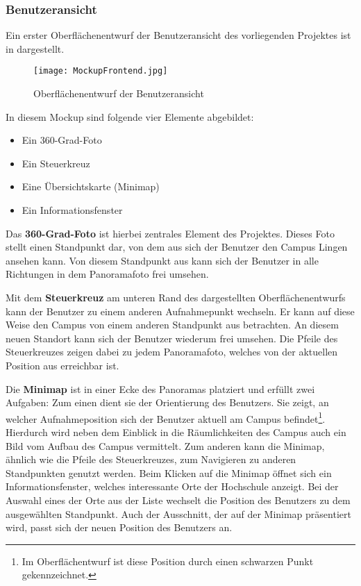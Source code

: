 \subsubsection{Benutzeransicht}
\label{sec:Benutzeransicht}

Ein erster Oberflächenentwurf der Benutzeransicht des vorliegenden Projektes
ist in  dargestellt.

\begin{figure}[htb]
\centering
\texttt{[image: MockupFrontend.jpg]}
\caption[Oberflächenentwurf der
Benutzeransicht]{Oberflächenentwurf der
Benutzeransicht\protect\footnotemark}
\label{fig:MockupFrontend}
\end{figure}

In diesem Mockup sind folgende vier Elemente abgebildet:

\begin{itemize}
 \item Ein 360-Grad-Foto
 \item Ein Steuerkreuz
 \item Eine Übersichtskarte (Minimap)
 \item Ein Informationsfenster
\end{itemize}

Das \textbf{360-Grad-Foto} ist hierbei zentrales Element des Projektes. Dieses
Foto stellt einen Standpunkt dar, von dem aus sich der Benutzer den Campus
Lingen ansehen kann. Von diesem Standpunkt aus kann sich der Benutzer in alle
Richtungen in dem Panoramafoto frei umsehen.

Mit dem \textbf{Steuerkreuz} am unteren Rand des dargestellten
Oberflächenentwurfs kann der Benutzer zu einem anderen Aufnahmepunkt wechseln.
Er kann auf diese Weise den Campus von einem anderen Standpunkt aus betrachten.
An diesem neuen Standort kann sich der Benutzer wiederum frei umsehen. Die
Pfeile des Steuerkreuzes zeigen dabei zu jedem Panoramafoto, welches von der
aktuellen Position aus erreichbar ist.

Die \textbf{Minimap} ist in einer Ecke des Panoramas platziert und erfüllt
zwei Aufgaben: Zum einen dient sie der Orientierung des Benutzers. Sie zeigt, an
welcher Aufnahmeposition sich der Benutzer aktuell am Campus
befindet\footnote{Im Oberflächentwurf ist diese Position durch einen schwarzen
Punkt gekennzeichnet.}. Hierdurch wird neben dem Einblick in die Räumlichkeiten
des Campus auch ein Bild vom Aufbau des Campus vermittelt. Zum anderen kann die
Minimap, ähnlich wie die Pfeile des Steuerkreuzes, zum Navigieren zu anderen
Standpunkten genutzt werden. Beim Klicken auf die Minimap öffnet sich ein
Informationsfenster, welches interessante Orte der Hochschule anzeigt. Bei der
Auswahl eines der Orte aus der Liste wechselt die Position des Benutzers zu
dem ausgewählten Standpunkt. Auch der Ausschnitt, der auf der Minimap
präsentiert wird, passt sich der neuen Position des Benutzers an.

